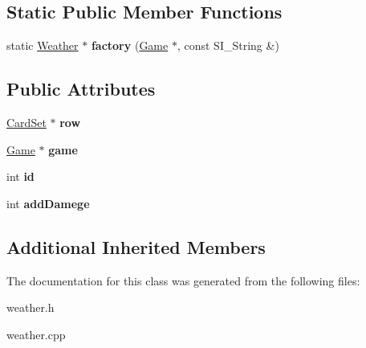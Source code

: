 \subsection*{Static Public Member Functions}
\begin{DoxyCompactItemize}
\item 
\mbox{\label{class_weather_a53a322e5f96d16a913ac9e4fe963dbf6}} 
static \hyperlink{class_weather}{Weather} $\ast$ {\bfseries factory} (\hyperlink{class_game}{Game} $\ast$, const S\+I\+\_\+\+String \&)
\end{DoxyCompactItemize}
\subsection*{Public Attributes}
\begin{DoxyCompactItemize}
\item 
\mbox{\label{class_weather_a0c9c6e62a821128bad912cd65abf8773}} 
\hyperlink{class_card_set}{Card\+Set} $\ast$ {\bfseries row}
\item 
\mbox{\label{class_weather_ae5780910b2272707d0af962f9612fb3d}} 
\hyperlink{class_game}{Game} $\ast$ {\bfseries game}
\item 
\mbox{\label{class_weather_ad71c0e943d232dddb6195d70d0039442}} 
int {\bfseries id}
\item 
\mbox{\label{class_weather_a4392e83007a52d1a33f56ccb58a52d06}} 
int {\bfseries add\+Damege}
\end{DoxyCompactItemize}
\subsection*{Additional Inherited Members}


The documentation for this class was generated from the following files\+:\begin{DoxyCompactItemize}
\item 
weather.\+h\item 
weather.\+cpp\end{DoxyCompactItemize}
